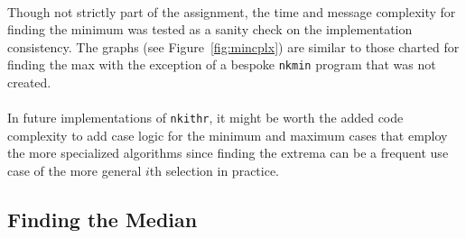 \documentclass[11pt,epsf]{article}
\begin{document}
{{    \paragraph{}{
      Though not strictly part of the assignment, the time and message complexity for
      finding the minimum was tested as a sanity check on the implementation consistency.
      The graphs (see Figure~\ref{fig:mincplx}) are similar to those charted for finding
      the max with the exception of a bespoke \texttt{nkmin} program that was not created.
    }
    \paragraph{}{
      In future implementations of \texttt{nkithr}, it might be worth the added
      code complexity to add case logic for the minimum and maximum cases that employ
      the more specialized algorithms since finding the extrema can be a frequent use
      case of the more general $i$th selection in practice.
    }
  }

  \subsection{Finding the Median}{
}}
\end{document}
